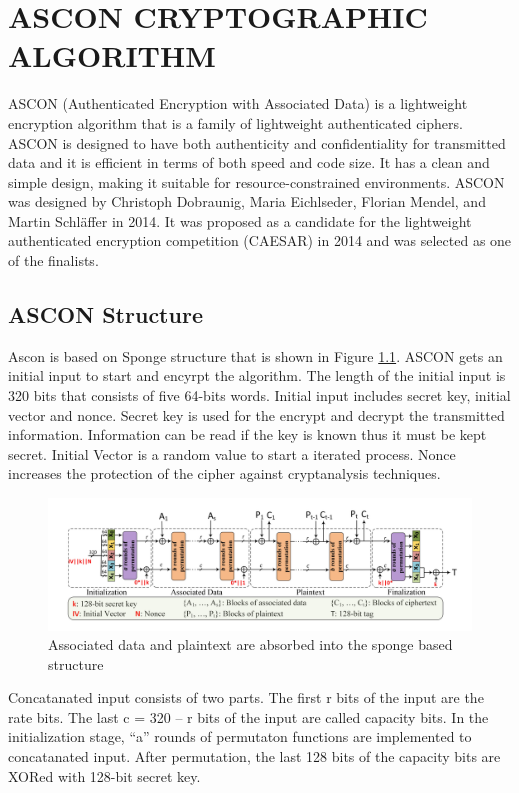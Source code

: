 \clearpage
\chapter{ASCON CRYPTOGRAPHIC ALGORITHM}\label{Chascon}
ASCON (Authenticated Encryption with Associated Data) is a lightweight encryption algorithm that is a family of lightweight authenticated ciphers. ASCON is designed to have both authenticity and confidentiality for transmitted data and it is efficient in terms of both speed and code size. It has a clean and simple design, making it suitable for resource-constrained environments. 
ASCON was designed by Christoph Dobraunig, Maria Eichlseder, Florian Mendel, and Martin Schläffer in 2014. It was proposed as a candidate for the lightweight authenticated encryption competition (CAESAR) in 2014 and was selected as one of the finalists.

\section{ASCON Structure}
Ascon is based on Sponge structure that is shown in Figure \ref{fig:sbox_structure}. ASCON gets an initial input to start and encyrpt the algorithm. The length of the initial input is 320 bits that consists of five 64-bits words. Initial input includes secret key, initial vector and nonce. Secret key is used for the encrypt and decrypt the transmitted information. Information can be read if the key is known thus it must be kept secret. Initial Vector is a random value to start a iterated process. Nonce increases the protection of the cipher against cryptanalysis techniques. 

\begin{figure}
    \centering
    \includegraphics[scale = 0.4]{ascon_sbox/s_box_structure.png}
    \caption{Associated data and plaintext are absorbed into the sponge based structure}
    \label{fig:sbox_structure}
\end{figure}
Concatanated input consists of two parts. The first r bits of the input are the rate bits. The last c = 320 – r bits of the input are called capacity bits. In the initialization stage, “a” rounds of permutaton functions are implemented to concatanated input. After permutation, the last 128 bits of the capacity bits are XORed with 128-bit secret key. 

